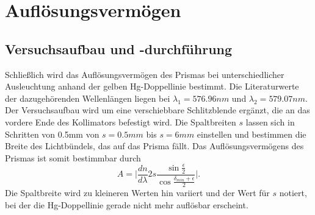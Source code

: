 \documentclass[12pt,a4paper]{article}
\begin{document}
\section{Auflösungsvermögen}
\subsection{Versuchsaufbau und -durchführung}
Schließlich wird das Auflösungsvermögen des Prismas bei unterschiedlicher Ausleuchtung anhand der gelben Hg-Doppellinie bestimmt. Die Literaturwerte der dazugehörenden Wellenlängen liegen bei $\lambda_1=576.96nm$ und $\lambda_2=579.07nm$. Der Versuchsaufbau wird um eine verschiebbare Schlitzblende ergänzt, die an das vordere Ende des Kollimators befestigt wird. Die Spaltbreiten $s$ lassen sich in Schritten von 0.5mm von $s=0.5mm$ bis $s=6mm$ einstellen und bestimmen die Breite des Lichtbündels, das auf das Prisma fällt. Das Auflösungsvermögens des Prismas ist somit bestimmbar durch
\begin{equation}\label{Aufloesungsvermoegen_Prisma}
A=\Big|\frac{dn}{d\lambda}2s\frac{\sin{\frac{\epsilon}{2}}}{\cos{\frac{\delta_{min}+\epsilon}{2}}}\Big|.
\end{equation}
Die Spaltbreite wird zu kleineren Werten hin variiert und der Wert für $s$ notiert, bei der die Hg-Doppellinie gerade nicht mehr auflösbar erscheint.
\end{document}

